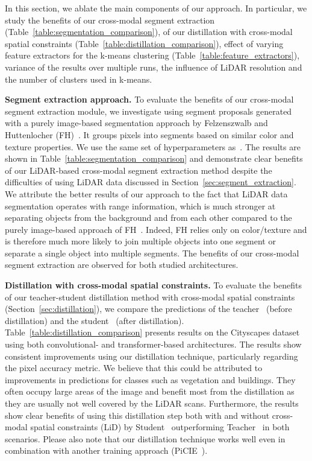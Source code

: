\documentclass[runningheads]{llncs}
\newcommand{\paragraphcustom}[1]{\smallskip\noindent\textbf{#1}}
\begin{document}
In this section, we ablate the main components of our 
approach. In particular, we study the benefits of our cross-modal segment extraction (Table~\ref{table:segmentation_comparison}),
of our distillation with cross-modal spatial constraints (Table~\ref{table:distillation_comparison}), 
effect of varying feature extractors for the k-means clustering (Table~\ref{table:feature_extractors}),
variance of the results over multiple runs, the influence of LiDAR resolution and the number of clusters used in k-means.

\paragraphcustom{Segment extraction approach.}
To evaluate the benefits of our cross-modal segment extraction module, we investigate using segment proposals generated with a purely image-based segmentation approach by Felzenszwalb and Huttenlocher (FH)~\cite{felzenszwalb2004efficient}. It groups pixels into segments based on similar color and texture properties.
We use the same set of hyperparameters as~\cite{henaff2021efficient}.  
The results are shown in Table~\ref{table:segmentation_comparison} 
and demonstrate clear benefits of our LiDAR-based cross-modal segment extraction method despite the difficulties of using LiDAR data discussed in Section~\ref{sec:segment_extraction}. 
We attribute the better results of our approach
to the fact that LiDAR 
data
segmentation operates with range information, which is much stronger at separating objects from the background and from each other compared to the purely image-based approach of FH~\cite{felzenszwalb2004efficient}. Indeed, FH relies only on color/texture and is therefore much more likely to join multiple objects into one segment or separate a single object into multiple segments. 
The benefits of our 
cross-modal segment extraction 
are observed for 
both studied
architectures.

\paragraphcustom{Distillation with cross-modal spatial constraints.} 
To evaluate the benefits of our teacher-student distillation method with cross-modal spatial constraints (Section~\ref{sec:distillation}), we compare the predictions of the teacher~ (before distillation) and the student~ (after distillation).
Table~\ref{table:distillation_comparison} presents results on the Cityscapes dataset using both convolutional- and transformer-based architectures.
The results show consistent improvements using our distillation technique, particularly regarding the pixel accuracy metric. 
We believe that this could be attributed to improvements in predictions for classes such as vegetation and buildings. They often occupy large areas of the image and benefit most from the distillation as they are usually not well covered by the LiDAR scans. 
Furthermore, the results show clear benefits of using this distillation step both with and without cross-modal spatial constraints (LiD) by Student~ outperforming Teacher~ in both scenarios. 
Please also note that our distillation technique works well even in combination with another training approach (PiCIE~\cite{cho2021picie}). 
\end{document}
